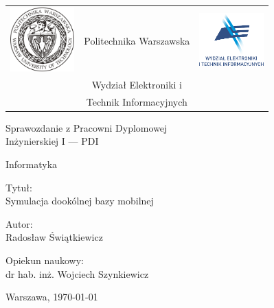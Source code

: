 \begin{titlepage}
\pagestyle{empty}

\noindent
\begin{large}
\begin{table}[t]
\centering
\begin{tabular}[t]{lcr}
 \includegraphics[width=70pt,height=70pt]{graphics/pw_logo.jpg} & Politechnika Warszawska & \includegraphics[width=70pt,height=70pt]{graphics/weiti_logo.pdf}\\
& Wydział Elektroniki i & \\
& Technik Informacyjnych &
\end{tabular}
\end{table}

\begin{center}Sprawozdanie z Pracowni Dyplomowej \\ Inżynierskiej I --- PDI\end{center}
\begin{center}Informatyka\end{center}\end{large}

\vfill
\begin{center}
\large
Tytuł: \\
\Huge
Symulacja dookólnej bazy mobilnej
\end{center}

\vfill
\begin{center}
\large
Autor: \\
\Large
Radosław Świątkiewicz
\end{center}

\vfill
\begin{center}
\large
Opiekun naukowy: \\
\Large
dr hab. inż. Wojciech Szynkiewicz
\end{center}

\vfill
\begin{center}
Warszawa, \today
\end{center}

\end{titlepage}